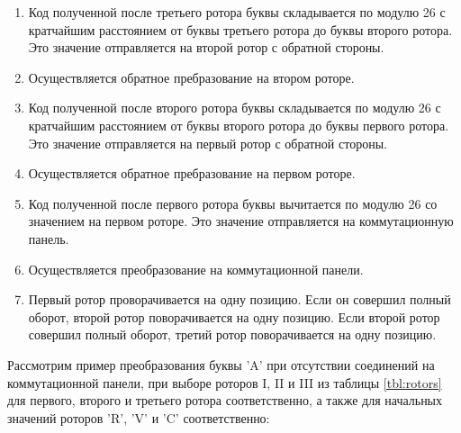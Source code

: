 \begin{enumerate}
	\item Код полученной после третьего ротора буквы складывается по модулю 26 с кратчайшим расстоянием от буквы третьего ротора до буквы второго ротора. Это значение отправляется на второй ротор с обратной стороны.
	\item Осуществляется обратное пребразование на втором роторе.
	\item Код полученной после второго ротора буквы складывается по модулю 26 с кратчайшим расстоянием от буквы второго ротора до буквы первого ротора. Это значение отправляется на первый ротор с обратной стороны.
	\item Осуществляется обратное пребразование на первом роторе.
	\item Код полученной после первого ротора буквы вычитается по модулю 26 со значением на первом роторе. Это значение отправляется на коммутационную панель.
	\item Осуществляется преобразование на коммутационной панели.
	\item Первый ротор проворачивается на одну позицию. Если он совершил полный оборот, второй ротор поворачивается на одну позицию. Если второй ротор совершил полный оборот, третий ротор поворачивается на одну позицию.
\end{enumerate}

Рассмотрим пример преобразования буквы 'A' при отсутствии соединений на коммутационной панели, при выборе роторов I, II и III из таблицы \ref{tbl:rotors} для первого, второго и третьего ротора соответственно, а также для начальных значений роторов 'R', 'V' и 'C' соответственно:

